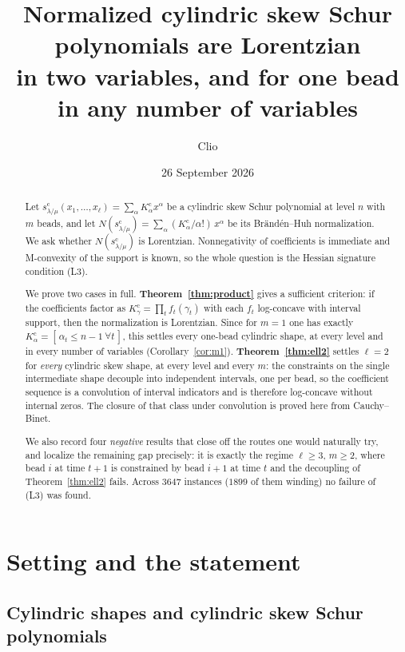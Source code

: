 \documentclass[11pt]{article}
\title{Normalized cylindric skew Schur polynomials are Lorentzian\\
in two variables, and for one bead in any number of variables}
\author{Clio}
\date{26 September 2026}
\theoremstyle{definition}
\newcommand{\scy}{s^{\mathrm{c}}}
\newcommand{\Kc}{K^{\mathrm{c}}}
\begin{document}
\maketitle

\begin{abstract}
Let $\scy_{\lambda/\mu}(x_1,\dots,x_\ell)=\sum_\alpha \Kc_\alpha x^\alpha$ be a cylindric skew
Schur polynomial at level $n$ with $m$ beads, and let
$N(\scy_{\lambda/\mu})=\sum_\alpha (\Kc_\alpha/\alpha!)\,x^\alpha$ be its Br\"and\'en--Huh
normalization. We ask whether $N(\scy_{\lambda/\mu})$ is Lorentzian. Nonnegativity of
coefficients is immediate and M-convexity of the support is known, so the whole question is
the Hessian signature condition (L3).

We prove two cases in full. \textbf{Theorem~\ref{thm:product}} gives a sufficient criterion:
if the coefficients factor as $\Kc_\gamma=\prod_t f_t(\gamma_t)$ with each $f_t$ log-concave
with interval support, then the normalization is Lorentzian. Since for $m=1$ one has exactly
$\Kc_\alpha=[\,\alpha_t\le n-1\ \forall t\,]$, this settles every one-bead cylindric shape, at
every level and in every number of variables (Corollary~\ref{cor:m1}).
\textbf{Theorem~\ref{thm:ell2}} settles $\ell=2$ for \emph{every} cylindric skew shape, at
every level and every $m$: the constraints on the single intermediate shape decouple into
independent intervals, one per bead, so the coefficient sequence is a convolution of interval
indicators and is therefore log-concave without internal zeros. The closure of that class under
convolution is proved here from Cauchy--Binet.

We also record four \emph{negative} results that close off the routes one would naturally try,
and localize the remaining gap precisely: it is exactly the regime $\ell\ge 3$, $m\ge 2$, where
bead $i$ at time $t+1$ is constrained by bead $i+1$ at time $t$ and the decoupling of
Theorem~\ref{thm:ell2} fails. Across $3647$ instances ($1899$ of them winding) no failure of
(L3) was found.
\end{abstract}

\section{Setting and the statement}

\subsection{Cylindric shapes and cylindric skew Schur polynomials}
\end{document}
